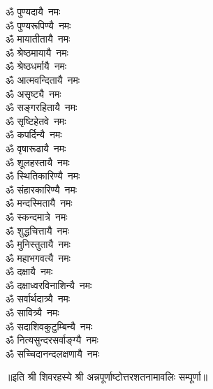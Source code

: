 \begin{multicols}{2}
\begin{flushleft}
ॐ पुण्यदायै~नमः\\
ॐ पुण्यरूपिण्यै~नमः\\
ॐ मायातीतायै~नमः\\
ॐ श्रेष्ठमायायै~नमः\\
ॐ श्रेष्ठधर्मायै~नमः\\
ॐ आत्मवन्दितायै~नमः\\
ॐ असृष्ट्यै~नमः\\
ॐ सङ्गरहितायै~नमः\hfill{}\\
ॐ सृष्टिहेतवे~नमः\\
ॐ कपर्दिन्यै~नमः\\
ॐ वृषारूढायै~नमः\\
ॐ शूलहस्तायै~नमः\\
ॐ स्थितिकारिण्यै~नमः\\
ॐ संहारकारिण्यै~नमः\\
ॐ मन्दस्मितायै~नमः\\
ॐ स्कन्दमात्रे~नमः\\
ॐ शुद्धचित्तायै~नमः\\
ॐ मुनिस्तुतायै~नमः\hfill{}\\
ॐ महाभगवत्यै~नमः\\
ॐ दक्षायै~नमः\\
ॐ दक्षाध्वरविनाशिन्यै~नमः\\
ॐ सर्वार्थदात्र्यै~नमः\\
ॐ सावित्र्यै~नमः\\
ॐ सदाशिवकुटुम्बिन्यै~नमः\\
ॐ नित्यसुन्दरसर्वाङ्ग्यै~नमः\\
ॐ सच्चिदानन्दलक्षणायै~नमः\\
\end{flushleft}
\end{multicols}
॥इति श्री शिवरहस्ये श्री अन्नपूर्णाष्टोत्तर\-शतनामावलिः सम्पूर्णा॥
